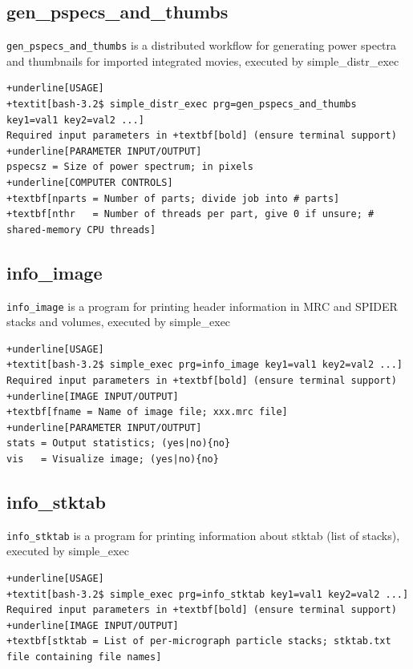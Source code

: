 \documentclass[a4paper,11pt]{article}
\newcommand{\prgname}[1]{\textcolor{NavyBlue}{\texttt{#1}}}
\begin{document}
\subsection{gen\_pspecs\_and\_thumbs}
\label{gen_pspecs_and_thumbs}
\prgname{gen\_pspecs\_and\_thumbs} is a distributed workflow for generating power spectra and thumbnails for imported integrated movies, executed by simple\_distr\_exec
\begin{Verbatim}[commandchars=+\[\],fontsize=\small,breaklines=true]
+underline[USAGE]
+textit[bash-3.2$ simple_distr_exec prg=gen_pspecs_and_thumbs key1=val1 key2=val2 ...]
Required input parameters in +textbf[bold] (ensure terminal support)
+underline[PARAMETER INPUT/OUTPUT]
pspecsz = Size of power spectrum; in pixels
+underline[COMPUTER CONTROLS]
+textbf[nparts = Number of parts; divide job into # parts]
+textbf[nthr   = Number of threads per part, give 0 if unsure; # shared-memory CPU threads]
\end{Verbatim}

\subsection{info\_image}
\label{info_image}
\prgname{info\_image} is a program for printing header information in MRC and SPIDER stacks and volumes, executed by simple\_exec
\begin{Verbatim}[commandchars=+\[\],fontsize=\small,breaklines=true]
+underline[USAGE]
+textit[bash-3.2$ simple_exec prg=info_image key1=val1 key2=val2 ...]
Required input parameters in +textbf[bold] (ensure terminal support)
+underline[IMAGE INPUT/OUTPUT]
+textbf[fname = Name of image file; xxx.mrc file]
+underline[PARAMETER INPUT/OUTPUT]
stats = Output statistics; (yes|no){no}
vis   = Visualize image; (yes|no){no}
\end{Verbatim}

\subsection{info\_stktab}
\label{info_stktab}
\prgname{info\_stktab} is a program for printing information about stktab (list of stacks), executed by simple\_exec
\begin{Verbatim}[commandchars=+\[\],fontsize=\small,breaklines=true]
+underline[USAGE]
+textit[bash-3.2$ simple_exec prg=info_stktab key1=val1 key2=val2 ...]
Required input parameters in +textbf[bold] (ensure terminal support)
+underline[IMAGE INPUT/OUTPUT]
+textbf[stktab = List of per-micrograph particle stacks; stktab.txt file containing file names]
\end{Verbatim}
\end{document}
